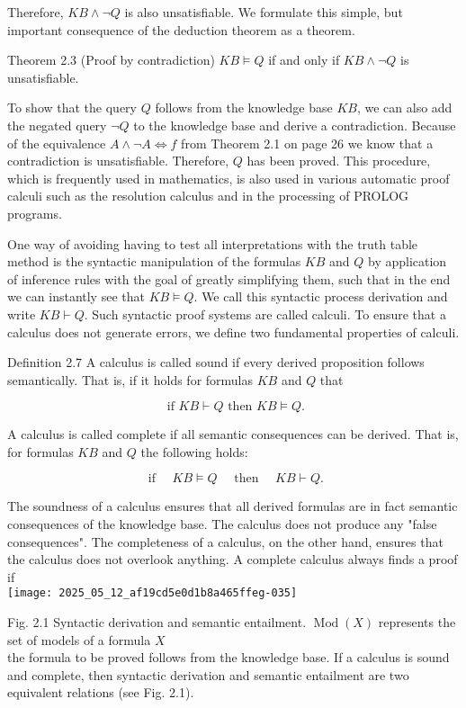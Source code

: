 \documentclass[10pt]{article}
\begin{document}
Therefore, $K B \wedge \neg Q$ is also unsatisfiable. We formulate this simple, but important consequence of the deduction theorem as a theorem.

Theorem 2.3 (Proof by contradiction) $K B \models Q$ if and only if $K B \wedge \neg Q$ is unsatisfiable.

To show that the query $Q$ follows from the knowledge base $K B$, we can also add the negated query $\neg Q$ to the knowledge base and derive a contradiction. Because of the equivalence $A \wedge \neg A \Leftrightarrow f$ from Theorem 2.1 on page 26 we know that a contradiction is unsatisfiable. Therefore, $Q$ has been proved. This procedure, which is frequently used in mathematics, is also used in various automatic proof calculi such as the resolution calculus and in the processing of PROLOG programs.

One way of avoiding having to test all interpretations with the truth table method is the syntactic manipulation of the formulas $K B$ and $Q$ by application of inference rules with the goal of greatly simplifying them, such that in the end we can instantly see that $K B \models Q$. We call this syntactic process derivation and write $K B \vdash Q$. Such syntactic proof systems are called calculi. To ensure that a calculus does not generate errors, we define two fundamental properties of calculi.

Definition 2.7 A calculus is called sound if every derived proposition follows semantically. That is, if it holds for formulas $K B$ and $Q$ that

$$
\text { if } K B \vdash Q \text { then } K B \models Q .
$$

A calculus is called complete if all semantic consequences can be derived. That is, for formulas $K B$ and $Q$ the following holds:

$$
\text { if } \quad K B \models Q \quad \text { then } \quad K B \vdash Q .
$$

The soundness of a calculus ensures that all derived formulas are in fact semantic consequences of the knowledge base. The calculus does not produce any "false consequences". The completeness of a calculus, on the other hand, ensures that the calculus does not overlook anything. A complete calculus always finds a proof if\\
\texttt{[image: 2025\_05\_12\_af19cd5e0d1b8a465ffeg-035]}

Fig. 2.1 Syntactic derivation and semantic entailment. $\operatorname{Mod}(X)$ represents the set of models of a formula $X$\\
the formula to be proved follows from the knowledge base. If a calculus is sound and complete, then syntactic derivation and semantic entailment are two equivalent relations (see Fig. 2.1).
\end{document}
